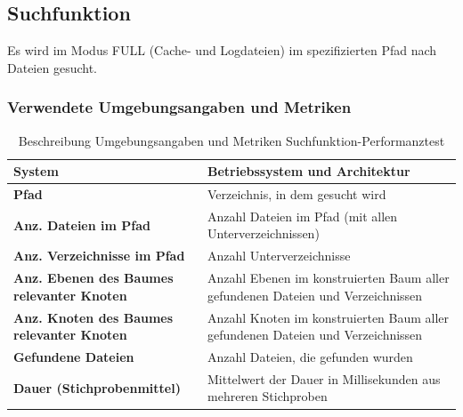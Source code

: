 \documentclass[a4paper,12pt]{report}
\begin{document}
    \subsection{Suchfunktion}\label{subsec:testduchfuhrung}
    Es wird im Modus FULL (Cache- und Logdateien) im spezifizierten Pfad nach Dateien gesucht.

    \subsubsection{Verwendete Umgebungsangaben und Metriken}\label{subsubsec:search-perftest-metrics-title}
    \begin{table}[h!]
        \centering
        \setlength{\leftmargini}{0.8cm}
        \begin{tabular}{|p{7cm}|p{7cm}|}
            \hline
            \textbf{System}                                            & Betriebssystem und Architektur                                                  \\ \hline
            \textbf{Pfad}                                              & Verzeichnis, in dem gesucht wird                                                \\ \hline
            \textbf{Anz. Dateien im Pfad}                              & Anzahl Dateien im Pfad (mit allen Unterverzeichnissen)                          \\ \hline
            \textbf{Anz. Verzeichnisse im Pfad}                        & Anzahl Unterverzeichnisse                                                       \\ \hline
            \textbf{Anz. Ebenen \newline des Baumes relevanter Knoten} & Anzahl Ebenen im konstruierten Baum aller gefundenen Dateien und Verzeichnissen \\ \hline
            \textbf{Anz. Knoten \newline des Baumes relevanter Knoten} & Anzahl Knoten im konstruierten Baum aller gefundenen Dateien und Verzeichnissen \\ \hline
            \textbf{Gefundene Dateien}                                 & Anzahl Dateien, die gefunden wurden                                             \\ \hline
            \textbf{Dauer (Stichprobenmittel)}                        & Mittelwert der Dauer in Millisekunden aus mehreren Stichproben                   \\ \hline
        \end{tabular}
        \caption{Beschreibung Umgebungsangaben und Metriken Suchfunktion-Performanztest}\label{tab:perf-search-metrics}
    \end{table}
\end{document}
